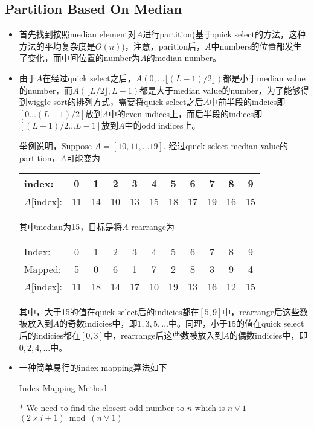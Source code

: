 \subsection{Partition Based On Median}
\begin{itemize}
\item 首先找到按照median element对$A$进行partition(基于quick select的方法，这种方法的平均复杂度是$ O(n) $)，注意，parition后，$A$中numbers的位置都发生了变化，而中间位置的number为$A$的median number。
\item 由于$A$在经过quick select之后，$A(0,\ldots \lfloor (L-1)/2\rfloor)$都是小于median value的number，而$A(\lfloor L/2\rfloor, L-1)$都是大于median value的number，为了能够得到wiggle sort的排列方式，需要将quick select之后$A$中前半段的indcies即$[0\ldots (L-1)/2]$放到$A$中的even indices上，而后半段的indices即$[(L+1)/2\ldots L-1]$放到$A$中的odd indices上。
\par
举例说明，Suppose $ A = [10,11,\ldots 19]$. 经过quick select median value的partition，$A$可能变为
\begin{table}[H]
\begin{tabular}{l*{10}{c}}
index: &  0 &  1 &  2 &  3 &   4 &   5 &  6 &  7 &  8 &   9\\
\hline
$A$[index]:&  11 & 14&  10&  13&   15&   18&  17 & 19&  16&  15
\end{tabular}
\end{table}
其中median为15，目标是将$A$ rearrange为
\begin{table}[H]
\begin{tabular}{l*{10}{c}}
Index: &  0 & 1 & 2 & 3 & 4 & 5 & 6 & 7 & 8 & 9 \\
Mapped: &  5 & 0 & 6 & 1 & 7 & 2 & 8 & 3 & 9 & 4\\
\hline
$A$[index]:&  11 & 18 & 14 & 17 & 10 & 19 & 13 & 16 & 12 & 15
\end{tabular}
\end{table}
其中，大于15的值在quick select后的indicies都在$[5, 9]$中，rearrange后这些数被放入到$A$的奇数indicies中，即$1, 3, 5, \ldots$中。同理，小于15的值在quick select后的indicies都在$[0,3]$中，rearrange后这些数被放入到$A$的偶数indicies中，即$0,2,4,\ldots$中。
\item 一种简单易行的index mapping算法如下
\begin{algorithm}[H]
\caption{Index Mapping Method}
\begin{algorithmic}[1]
\State $\ast$ We need to find the closest odd number to $n$ which is $n\lor 1$
\State \Return $(2\times i +1)\bmod(n\lor 1)$ 
\EndProcedure

\end{algorithmic}
\end{algorithm}
\end{itemize}
